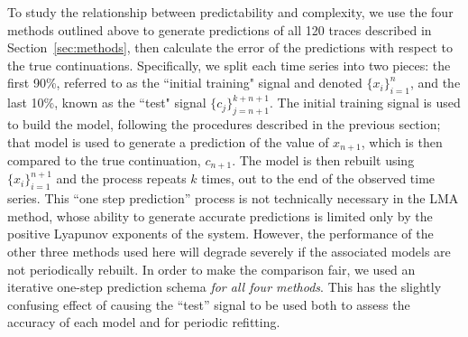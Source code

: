 To study the relationship between predictability and complexity, we
use the four methods outlined above to generate predictions of all 120
traces described in Section~\ref{sec:methods}, then calculate the
error of the predictions with respect to the true continuations.
Specifically, we split each time series into two pieces: the first
90\%, referred to as the ``initial training" signal and denoted
$\{x_i\}_{i=1}^{n}$, and the last 10\%, known as the ``test" signal
$\{c_j\}_{j=n+1}^{k+n+1}$.  The initial training signal is used to
build the model, following the procedures described in the previous
section; that model is used to generate a prediction of the value of
$x_{n+1}$, which is then compared to the true continuation, $c_{n+1}$.
The model is then rebuilt using $\{x_i\}_{i=1}^{n+1}$ and the process
repeats $k$ times, out to the end of the observed time series.  This
``one step prediction'' process is not technically necessary in the
LMA method, whose ability to generate accurate predictions is limited
only by the positive Lyapunov exponents of the system.  However, the
performance of the other three methods used here will degrade severely
if the associated models are not periodically rebuilt.  In order to
make the comparison fair, we used an iterative one-step prediction
schema \emph{for all four methods}.  This has the slightly confusing
effect of causing the ``test'' signal to be used both to assess the
accuracy of each model and for periodic refitting.

